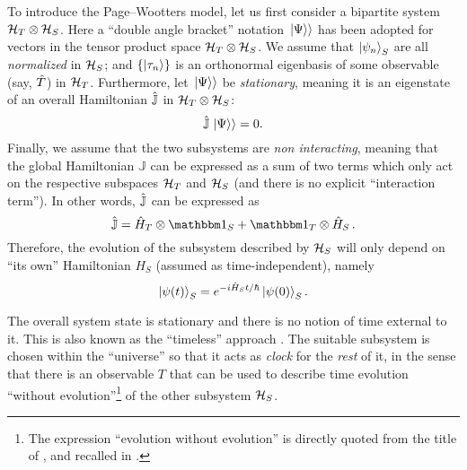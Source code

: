To introduce the Page--Wootters model, let us first consider
a bipartite system $\mathcal{H}_T \otimes \mathcal{H}_S$.
Here
a ``double angle bracket'' notation $\left.\left| \Psi \right\rangle\right\rangle$ has been adopted
for vectors in the tensor product space $\mathcal{H}_T \otimes \mathcal{H}_S$.
We assume that $\ket{\psi_{n}}_{S}$ are all \emph{normalized} in $\mathcal{H}_S$;
and
$\qty{\ket{{\tau}_n}}$ is an orthonormal eigenbasis of some observable (say, $\hat{T}$)
in $\mathcal{H}_T$.
Furthermore, let $\left.\left| \Psi \right\rangle\right\rangle$ be \emph{stationary}, meaning it is an eigenstate
of an overall Hamiltonian $\hat{\mathbb{J}}$ in $\mathcal{H}_T \otimes \mathcal{H}_S$:
\begin{equation}\label{eq:Wheeler-DeWitt}
  \hat{\mathbb{J}} \left.\left| \Psi \right\rangle\right\rangle = 0 \text{.}
\end{equation}
Finally, we assume that the two subsystems
are \emph{non interacting},
meaning that the global Hamiltonian $\mathbb{J}$ can be expressed as a sum of two terms
which only act on the respective subspaces $\mathcal{H}_T$ and $\mathcal{H}_S$
(and there is no explicit ``interaction term''). In other words,
$\hat{\mathbb{J}}$ can be expressed as
\begin{equation}\label{eq:pwHamiltonian}
  \op{\mathbb{J}} = \op{H}_T \ox \idop_S + \idop_T \ox \op{H}_S \, \text{.} 
\end{equation}
Therefore,
the evolution of the subsystem described by $\mathcal{H}_S$
will only depend on ``its own''
Hamiltonian $H_S$ (assumed as time-independent), namely
\begin{equation}\label{eq:pw:ordinary_S}
  \ket{\psi(t)}_S = e^{- i \hat{H}_S t / \hbar} \ket{\psi(0)}_S \text{.}  
\end{equation}
 
The overall system state
is stationary and there is no notion
of time external to it.
This is also known as the
``timeless'' approach \parencite{Marletto:Evolution}.
\citereset
The suitable subsystem is chosen within the ``universe'' so that it acts as
\emph{clock} for the \emph{rest} of it, in the sense that
there is an observable $T$
that can be used to
describe time evolution ``without evolution''\footnote{
  The expression ``evolution without evolution''
  is directly quoted from the title of \cite{PageWootters},
  and recalled in \cite{Marletto:Evolution}.
}
of the other subsystem $\mathcal{H}_S$.

